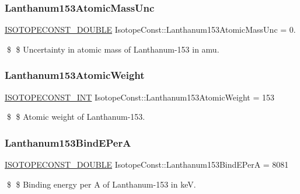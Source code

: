 \subsubsection{\texorpdfstring{Lanthanum153\+Atomic\+Mass\+Unc}{Lanthanum153AtomicMassUnc}}
{\footnotesize\ttfamily \mbox{\hyperlink{group___isotope_const-_macros_ga8f45a7272ce02c0b4c65c44636ed719a}{I\+S\+O\+T\+O\+P\+E\+C\+O\+N\+S\+T\+\_\+\+D\+O\+U\+B\+LE}} Isotope\+Const\+::\+Lanthanum153\+Atomic\+Mass\+Unc = 0.}

\$ \$ Uncertainty in atomic mass of Lanthanum-\/153 in amu. \mbox{\label{group___isotope_const-_lanthanum-_la153_gaf05d6fa21066e741c45c8c57f5272d67}} 
\subsubsection{\texorpdfstring{Lanthanum153\+Atomic\+Weight}{Lanthanum153AtomicWeight}}
{\footnotesize\ttfamily \mbox{\hyperlink{group___isotope_const-_macros_ga5f18360b3e99483a35c32d789e62621c}{I\+S\+O\+T\+O\+P\+E\+C\+O\+N\+S\+T\+\_\+\+I\+NT}} Isotope\+Const\+::\+Lanthanum153\+Atomic\+Weight = 153}

\$ \$ Atomic weight of Lanthanum-\/153. \mbox{\label{group___isotope_const-_lanthanum-_la153_gad9d115fca124cdb0fcccbe1b580b9a49}} 
\subsubsection{\texorpdfstring{Lanthanum153\+Bind\+E\+PerA}{Lanthanum153BindEPerA}}
{\footnotesize\ttfamily \mbox{\hyperlink{group___isotope_const-_macros_ga8f45a7272ce02c0b4c65c44636ed719a}{I\+S\+O\+T\+O\+P\+E\+C\+O\+N\+S\+T\+\_\+\+D\+O\+U\+B\+LE}} Isotope\+Const\+::\+Lanthanum153\+Bind\+E\+PerA = 8081}

\$ \$ Binding energy per A of Lanthanum-\/153 in keV. \mbox{\label{group___isotope_const-_lanthanum-_la153_ga0ccf1d9a711cc36742f350851bdad531}} 
